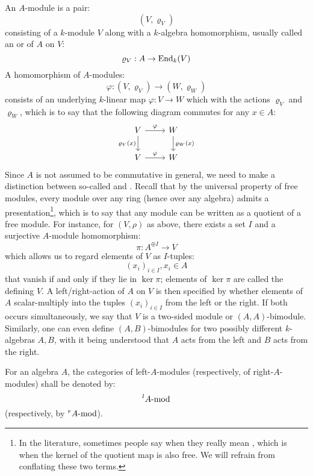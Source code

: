        An $A$-module is a pair:
            $$(V, \varrho_V)$$
        consisting of a $k$-module $V$ along with a $k$-algebra homomorphism, usually called an  or  of $A$ on $V$:
            $$\varrho_V: A \to \End_k(V)$$
        A homomorphism of $A$-modules:
            $$\varphi: (V, \varrho_V) \to (W, \varrho_W)$$
        consists of an underlying $k$-linear map $\varphi: V \to W$ which  with the actions $\varrho_V$ and $\varrho_W$, which is to say that the following diagram commutes for any $x \in A$:
            $$
                \begin{tikzcd}
            	V & W \\
            	V & W
            	\arrow["\varphi", from=1-1, to=1-2]
            	\arrow["{\varrho_V(x)}"', from=1-1, to=2-1]
            	\arrow["{\varrho_W(x)}", from=1-2, to=2-2]
            	\arrow["\varphi", from=2-1, to=2-2]
                \end{tikzcd}
            $$
        Since $A$ is not assumed to be commutative in general, we need to make a distinction between so-called  and . Recall that by the universal property of free modules, every module over any ring (hence over any algebra) admits a presentation\footnote{In the literature, sometimes people say  when they really mean , which is when the kernel of the quotient map is also free. We will refrain from conflating these two terms.}, which is to say that any module can be written as a quotient of a free module. For instance, for $(V, \rho)$ as above, there exists a set $I$ and a surjective $A$-module homomorphism:
            $$\pi: A^{\oplus I} \to V$$
        which allows us to regard elements of $V$ as $I$-tuples:
            $$(x_i)_{i \in I}, x_i \in A$$
        that vanish if and only if they lie in $\ker \pi$; elements of $\ker \pi$ are called the  defining $V$. A left/right-action of $A$ on $V$ is then specified by whether elements of $A$ scalar-multiply into the tuples $(x_i)_{i \in I}$ from the left or the right. If both occurs simultaneously, we say that $V$ is a two-sided module or $(A, A)$-bimodule. Similarly, one can even define $(A, B)$-bimodules for two possibly different $k$-algebras $A, B$, with it being understood that $A$ acts from the left and $B$ acts from the right.
        \begin{convention}
            For an algebra $A$, the categories of left-$A$-modules (respectively, of right-$A$-modules) shall be denoted by:
                $${}^lA\mod$$
            (respectively, by ${}^rA\mod$).
        \end{convention}
